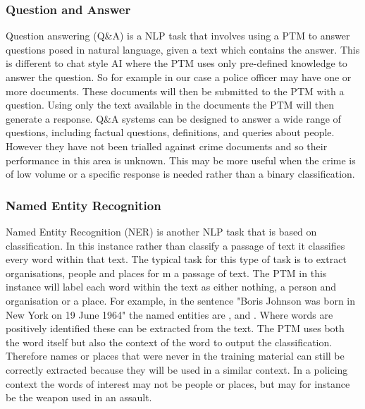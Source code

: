 \subsubsection{Question and Answer} Question answering (Q\&A) is a NLP task that involves using a PTM to answer questions posed in natural language, given a text which contains the answer. This is different to chat style AI where the PTM uses only pre-defined knowledge to answer the question. So for example in our case a police officer may have one or more documents. These documents will then be submitted to the PTM with a question. Using only the text available in the documents the PTM will then generate a response. Q\&A systems can be designed to answer a wide range of questions, including factual questions, definitions, and queries about people. However they have not been trialled against crime documents and so their performance in this area is unknown. This may be more useful when the crime is of low volume or a specific response is needed rather than a binary classification.

\subsubsection{Named Entity Recognition} Named Entity Recognition (NER) is another NLP task that is based on classification. In this instance rather than classify a passage of text it classifies every word within that text. The typical task for this type of task is to extract organisations, people and places for m a passage of text. The PTM in this instance will label each word within the text as either nothing, a person and organisation or a place. For example, in the sentence "Boris Johnson was born in New York on 19 June 1964" the named entities are ,  and . Where words are positively identified these can be extracted from the text. The PTM uses both the word itself but also the context of the word to output the classification. Therefore names or places that were never in the training material can still be correctly extracted because they will be used in a similar context. In a policing context the words of interest may not be people or places, but may for instance be the weapon used in an assault.



